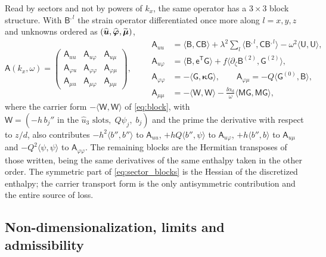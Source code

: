Read by sectors and not by powers of $k_x$, the same operator has a $3\times3$ block
structure.  With $\mathsf B^{,l}$ the strain operator differentiated once more along $l=x,y,z$ and unknowns ordered as
$(\widehat{\boldsymbol{u}},\widehat{\boldsymbol\varphi},\widetilde{\boldsymbol\mu})$,
\begin{equation}
\label{eq:sector_blocks}
\mathsf A(k_x,\omega)=
\begin{pmatrix}
\mathsf A_{uu} & \mathsf A_{u\varphi} & \mathsf A_{u\mu}\\[2pt]
\mathsf A_{\varphi u} & \mathsf A_{\varphi\varphi} & \mathsf A_{\varphi\mu}\\[2pt]
\mathsf A_{\mu u} & \mathsf A_{\mu\varphi} & \mathsf A_{\mu\mu}
\end{pmatrix},
\qquad
\begin{aligned}
\mathsf A_{uu}&=\langle\mathsf B,\mathsf C\mathsf B\rangle
+\lambda^{2}\sum_{l}\langle\mathsf B^{,l},\mathsf C\mathsf B^{,l}\rangle
-\omega^{2}\langle\mathsf U,\mathsf U\rangle,\\
\mathsf A_{u\varphi}&=\langle\mathsf B,\mathsf e^{\mathsf T}\mathsf G\rangle
+f\langle\partial_\zeta\mathsf B^{(2)},\mathsf G^{(2)}\rangle,\\
\mathsf A_{\varphi\varphi}&=-\langle\mathsf G,\boldsymbol\kappa\mathsf G\rangle,\qquad
\mathsf A_{\varphi\mu}=-Q\langle\mathsf G^{(0)},\mathsf B\rangle,\\
\mathsf A_{\mu\mu}&=-\langle\mathsf W,\mathsf W\rangle
-\frac{\ii\alpha_{\mathrm d}}{\omega}\langle\mathsf M\mathsf G,\mathsf M\mathsf G\rangle,
\end{aligned}
\end{equation}
where the carrier form $-\langle\mathsf W,\mathsf W\rangle$ of \eqref{eq:block}, with
$\mathsf W=(-h\,b_j''\text{ in the }\widehat u_3\text{ slots},\;Q\psi_j,\;b_j)$ and the
prime the derivative with respect to $z/d$, also contributes
$-h^{2}\langle b'',b''\rangle$ to $\mathsf A_{uu}$, $+hQ\langle b'',\psi\rangle$ to
$\mathsf A_{u\varphi}$, $+h\langle b'',b\rangle$ to $\mathsf A_{u\mu}$ and
$-Q^{2}\langle\psi,\psi\rangle$ to $\mathsf A_{\varphi\varphi}$.  The remaining
blocks are the Hermitian transposes of those written, being the same derivatives of the
same enthalpy taken in the other order.  The symmetric part of \eqref{eq:sector_blocks}
is the Hessian of the discretized enthalpy; the carrier transport form is the only
antisymmetric contribution and the entire source of loss.

\subsection{Non-dimensionalization, limits and admissibility}
\label{sec:governing_nondim}
\label{sec:governing_limits}
\label{sec:governing_stability}

